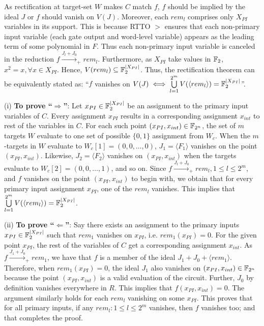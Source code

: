 \begin{Proof}
As rectification at target-set $W$ makes $C$ match $f$, 
$f$ should be implied by the ideal $J$ or 
$f$ should vanish on $V(J)$.
Moreover, each $rem_l$ comprises only $X_{PI}$ variables in its support. This is
because RTTO $>$ ensures that each non-primary input variable (each gate
output and word-level variable) appears as the leading term of some
polynomial in $F$. Thus each non-primary input variable is canceled
in the reduction $f\xrightarrow{J_l+ J_{0}}_+ rem_l$. Furthermore,
as $X_{PI}$ take values in ${\mathbb{F}}_2$, $x^2=x, \forall x \in
X_{PI}$. Hence, 
$V(rem_l) \subseteq {\mathbb{F}}_{2}^{|X_{PI}|}$. Thus, the rectification theorem
 can be equivalently stated as: ``$f$ vanishes on
$V(J) \iff \bigcup\limits_{l=1}^{2^m}V(\langle rem_l \rangle) = {\mathbb{F}}_{2}^{|X_{PI}|}$''.

(i) {\bf To prove ``$\Rightarrow$''}: Let $x_{PI} \in {\mathbb{F}}_{2}^{|X_{PI}|}$ be an
assignment to the primary input variables of $C$. Every assignment
$x_{PI}$ results in a corresponding assignment $x_{int}$ 
to rest of the variables in $C$. For each such point $(x_{PI},x_{int})\in {\mathbb{F}}_{2^n}$,
the set of $m$ targets $W$ evaluate to one set of possible $\{0,1\}$ assignment
from $W_c$. When the $m$-targets in $W$ evaluate to  $W_c[1] = (0,0,\dots,0)$,
$J_1 = \langle F_1 \rangle$ vanishes on the point $(x_{PI},x_{int})$. 
Likewise, $J_2 = \langle F_2 \rangle$ vanishes on $(x_{PI},x_{int})$ when the targets 
evaluate to $W_c[2] = (0,0,\dots,1)$, and so on. Since
$f\xrightarrow{J_l + J_0}_+rem_l,1 \leq l \leq 2^m$, and $f$ vanishes
on the point $(x_{PI},x_{int})$ to begin with, we obtain that for
every  primary input assignment $x_{PI}$, one of the $rem_l$ vanishes. This
implies that $ \bigcup\limits_{l=1}^{2^m}V(\langle rem_l\rangle) = {\mathbb{F}}_{2}^{|X_{PI}|}$.

(ii) {\bf To prove ``$\Leftarrow$''}: Say there exists an assignment to the
primary inputs $x_{PI} \in {\mathbb{F}}_{2}^{|X_{PI}|}$ such that $rem_1$ vanishes on
$x_{PI}$, i.e. $rem_1(x_{PI})=0$. For the given point $x_{PI}$, the rest of the variables 
of $C$ get a corresponding assignment $x_{int}$. 
As $f\xrightarrow{J_1 + J_0}_+ rem_1$, we have that $f$ is a member of the
ideal $J_1 + J_0 + \langle rem_1 \rangle$. Therefore, when
$rem_1(x_{PI})=0$, the ideal $J_1$ also vanishes on $(x_{PI},x_{int}) \in {\mathbb{F}}_{2^n}$
because the point $(x_{PI},x_{int})$ is a valid evaluation of the circuit.
Further, $J_0$ by definition vanishes everywhere in $R$. This implies that
$f(x_{PI},x_{int})=0$. The argument similarly holds for each
$rem_{l}$ vanishing on some $x_{PI}$. This proves that for all primary
inputs, if any $rem_l:1 \leq l \leq 2^m$ vanishes, then $f$ vanishes too; and 
that completes the proof.
\end{Proof}

